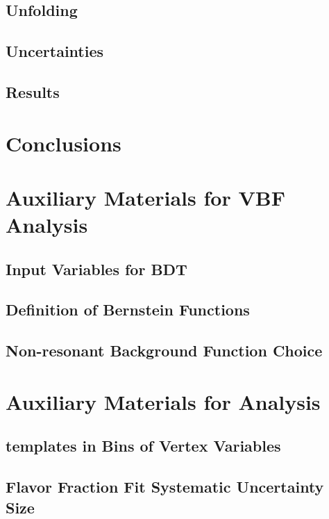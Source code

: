 \documentclass{report}
\begin{document}
\section{Unfolding}
\label{sec:gbb-unfolding}

\clearpage

\section{Uncertainties}
\label{sec:gbb-systs}



\section{Results}
\label{sec:gbb-results}

\clearpage

\chapter{Conclusions}
\clearpage

\appendix
\chapter{Auxiliary Materials for VBF \Hbb Analysis}
\section{Input Variables for BDT}

\section{Definition of Bernstein Functions}

\section{Non-resonant Background Function Choice}


\chapter{Auxiliary Materials for \gbb Analysis}
\section{\subsdzero templates in Bins of Vertex Variables}

\clearpage
\section{Flavor Fraction Fit Systematic Uncertainty Size}

\clearpage
\end{document}
